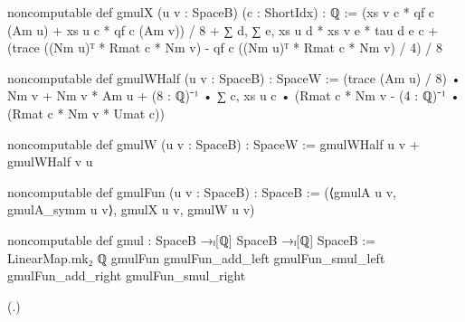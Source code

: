 \begin{leancode}
noncomputable def gmulX (u v : SpaceB) (c : ShortIdx) : ℚ :=
  (xs v c * qf c (Am u) + xs u c * qf c (Am v)) / 8 +
    ∑ d, ∑ e, xs u d * xs v e * tau d e c +
    (trace ((Nm u)ᵀ * Rmat c * Nm v) - qf c ((Nm u)ᵀ * Rmat c * Nm v) / 4) / 8

noncomputable def gmulWHalf (u v : SpaceB) : SpaceW :=
  (trace (Am u) / 8) • Nm v + Nm v * Am u +
    (8 : ℚ)⁻¹ • ∑ c, xs u c • (Rmat c * Nm v - (4 : ℚ)⁻¹ • (Rmat c * Nm v * Umat c))

noncomputable def gmulW (u v : SpaceB) : SpaceW := gmulWHalf u v + gmulWHalf v u

noncomputable def gmulFun (u v : SpaceB) : SpaceB :=
  (⟨gmulA u v, gmulA_symm u v⟩, gmulX u v, gmulW u v)
\end{leancode}
\begin{leancode}
noncomputable def gmul : SpaceB →ₗ[ℚ] SpaceB →ₗ[ℚ] SpaceB :=
  LinearMap.mk₂ ℚ gmulFun gmulFun_add_left gmulFun_smul_left gmulFun_add_right
    gmulFun_smul_right
\end{leancode}
(.)

